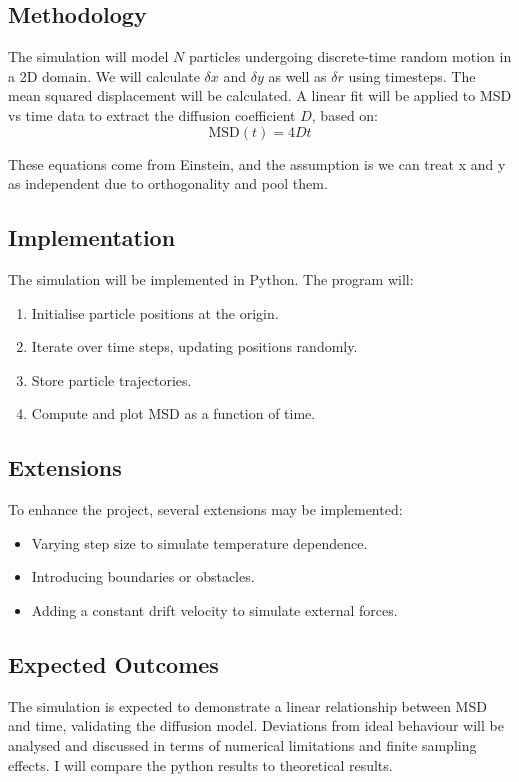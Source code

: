 \documentclass[12pt]{article}
\begin{document}
\subsection{Methodology}
The simulation will model $N$ particles undergoing discrete-time random motion in a 2D domain. We will calculate $\delta x$ and $\delta y$ as well as $\delta r$ using timesteps.
The mean squared displacement will be calculated.
A linear fit will be applied to MSD vs time data to extract the diffusion coefficient $D$, based on:
\[
\text{MSD}(t) = 4Dt
\]

These equations come from Einstein, and the assumption is we can treat x and y as independent due to orthogonality and pool them.

\subsection{Implementation}
The simulation will be implemented in Python. The program will:
\begin{enumerate}
    \item Initialise particle positions at the origin.
    \item Iterate over time steps, updating positions randomly.
    \item Store particle trajectories.
    \item Compute and plot MSD as a function of time.
\end{enumerate}

\subsection{Extensions}
To enhance the project, several extensions may be implemented:
\begin{itemize}
    \item Varying step size to simulate temperature dependence.
    \item Introducing boundaries or obstacles.
    \item Adding a constant drift velocity to simulate external forces.
\end{itemize}

\subsection{Expected Outcomes}
The simulation is expected to demonstrate a linear relationship between MSD and time, validating the diffusion model. Deviations from ideal behaviour will be analysed and discussed in terms of numerical limitations and finite sampling effects. I will compare the python results to theoretical results.
\end{document}
